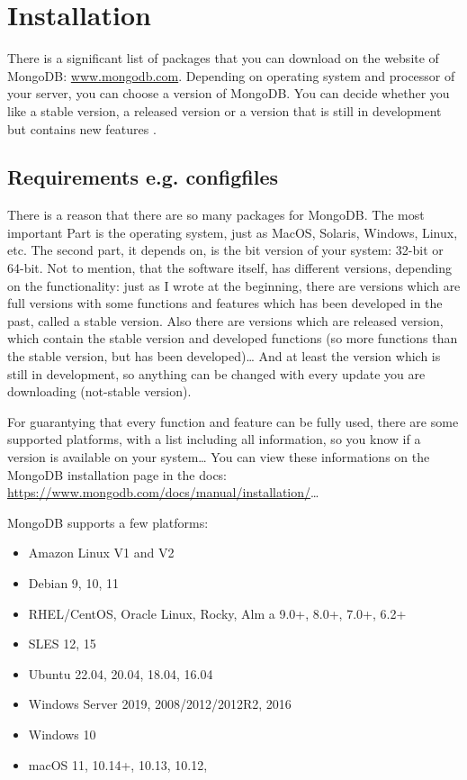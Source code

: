 
\section{Installation}
There is a significant list of packages that you can download on the website of MongoDB: \url{www.mongodb.com}. Depending on operating system and processor of your server, you can choose a version of MongoDB. 
You can decide whether you like a stable version, a released version or a version that is still in development but contains new features \parencite{Membrey2014}.

\subsection{Requirements e.g. configfiles}
There is a reason that there are so many packages for MongoDB. The most important Part is the operating system, just as MacOS, Solaris, Windows, Linux, etc. 
The second part, it depends on, is the bit version of your  system: 32-bit or 64-bit. 
Not to mention, that the software itself, has different versions, depending on the functionality: just as I wrote at the beginning, there are versions which are full versions with some functions and features which has been developed in the past, called a stable version. 
Also there are versions which are released version, which contain the stable version and developed functions (so more functions than the stable version, but has been developed)\dots
And at least the version which is still in development, so anything can be changed with every update you are downloading (not-stable version).

For guarantying that every function and feature can be fully used, there are some supported platforms, with a list including all information, so you know if a version is available on your system\dots
You can view these informations on the MongoDB installation page in the docs: \url{https://www.mongodb.com/docs/manual/installation/}\dots

MongoDB supports a few platforms: 
\begin{itemize}
    \item Amazon Linux V1 and V2
    \item Debian 9, 10, 11
    \item RHEL/CentOS, Oracle Linux, Rocky, Alm a 9.0+, 8.0+, 7.0+, 6.2+
    \item SLES 12, 15
    \item Ubuntu 22.04, 20.04, 18.04, 16.04
    \item Windows Server 2019, 2008/2012/2012R2, 2016
    \item Windows 10
    \item macOS 11, 10.14+, 10.13, 10.12, 
\end{itemize}

